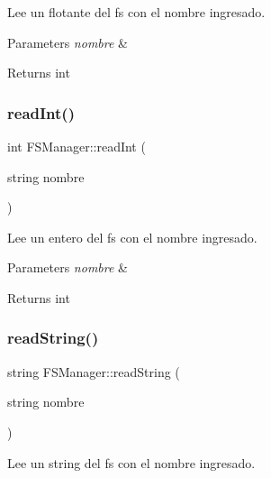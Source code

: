 Lee un flotante del fs con el nombre ingresado. 


\begin{DoxyParams}{Parameters}
{\em nombre} & \\
\hline
\end{DoxyParams}
\begin{DoxyReturn}{Returns}
int 
\end{DoxyReturn}
\mbox{\label{classFSManager_a819ea57611717a89633a5b02cb4d0f10}} 
\subsubsection{\texorpdfstring{read\+Int()}{readInt()}}
{\footnotesize\ttfamily int F\+S\+Manager\+::read\+Int (\begin{DoxyParamCaption}\item[{string}]{nombre }\end{DoxyParamCaption})\hspace{0.3cm}{\ttfamily [inline]}}



Lee un entero del fs con el nombre ingresado. 


\begin{DoxyParams}{Parameters}
{\em nombre} & \\
\hline
\end{DoxyParams}
\begin{DoxyReturn}{Returns}
int 
\end{DoxyReturn}
\mbox{\label{classFSManager_ac8de8da2e2ebf395340b46b353cec02e}} 
\subsubsection{\texorpdfstring{read\+String()}{readString()}}
{\footnotesize\ttfamily string F\+S\+Manager\+::read\+String (\begin{DoxyParamCaption}\item[{string}]{nombre }\end{DoxyParamCaption})\hspace{0.3cm}{\ttfamily [inline]}}



Lee un string del fs con el nombre ingresado. 


